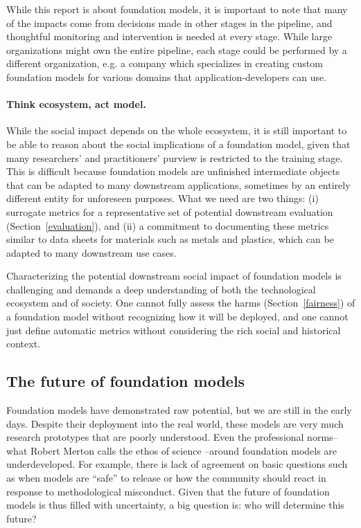 While this report is about foundation models, it is important to note that many of the impacts come from decisions made in other stages in the pipeline, and thoughtful monitoring and intervention is needed at every stage. While large organizations might own the entire pipeline, each stage could be performed by a different organization, e.g. a company which specializes in creating custom foundation models for various domains that application-developers can use.

\paragraph{Think ecosystem, act model.} While the social impact depends on the whole ecosystem, it is still important to be able to reason about the social implications of a foundation model, given that many researchers' and practitioners' purview is restricted to the training stage. This is difficult because foundation models are unfinished intermediate objects that can be adapted to many downstream applications, sometimes by an entirely different entity for unforeseen purposes. What we need are two things: (i) surrogate metrics for a representative set of potential downstream evaluation (Section~\ref{evaluation}),
and (ii) a commitment to documenting these metrics \citep{Mitchell_2019} similar to data sheets for materials such as metals and plastics, which can be adapted to many downstream use cases.

Characterizing the potential downstream social impact of foundation models is challenging and demands a deep understanding of both the technological ecosystem and of society. One cannot fully assess the harms (Section~\ref{fairness}) of a foundation model without recognizing how it will be deployed, and one cannot just define automatic metrics without considering the rich social and historical context.

\subsection{The future of foundation models}
\label{sec:developers}

Foundation models have demonstrated raw potential, but we are still in the early days. Despite their deployment into the real world, these models are very much research prototypes that are poorly understood. Even the professional norms--what Robert Merton calls the ethos of science \citep{merton1979normative}--around foundation models are underdeveloped. For example, there is lack of agreement on basic questions such as when models are ``safe'' to release or how the community should react in response to methodological misconduct. Given that the future of foundation models is thus filled with uncertainty, a big question is: who will determine this future?

